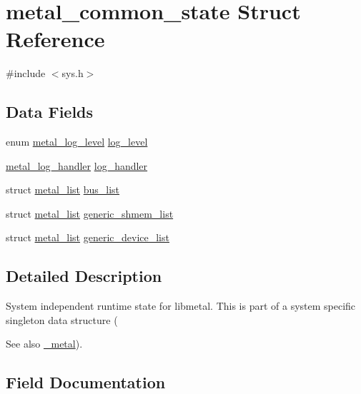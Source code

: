 \hypertarget{structmetal__common__state}{}\section{metal\+\_\+common\+\_\+state Struct Reference}
\label{structmetal__common__state}


{\ttfamily \#include $<$sys.\+h$>$}

\subsection*{Data Fields}
\begin{DoxyCompactItemize}
\item 
enum \hyperlink{group__logging_ga4ffa0f4a1339af510aca7f817ee36d82}{metal\+\_\+log\+\_\+level} \hyperlink{structmetal__common__state_a326c2fb27f8d538f7501d02bd6c3a851}{log\+\_\+level}
\item 
\hyperlink{group__logging_gaa79b2a8962227bb67c242b98afda292a}{metal\+\_\+log\+\_\+handler} \hyperlink{structmetal__common__state_abc8928c9100135369eeba2900ba860ea}{log\+\_\+handler}
\item 
struct \hyperlink{structmetal__list}{metal\+\_\+list} \hyperlink{structmetal__common__state_a47da0bf7bafa6e91aac71595110d95c7}{bus\+\_\+list}
\item 
struct \hyperlink{structmetal__list}{metal\+\_\+list} \hyperlink{structmetal__common__state_a4e6dbc8ec1a13f26a28c82b079f10395}{generic\+\_\+shmem\+\_\+list}
\item 
struct \hyperlink{structmetal__list}{metal\+\_\+list} \hyperlink{structmetal__common__state_a6fe99825ec2fb2d2388f598a1339a2c7}{generic\+\_\+device\+\_\+list}
\end{DoxyCompactItemize}


\subsection{Detailed Description}
System independent runtime state for libmetal. This is part of a system specific singleton data structure (\begin{DoxySeeAlso}{See also}
\hyperlink{group__system_ga929f8594b076a54b9773b4ab8ca2327d}{\+\_\+metal}). 
\end{DoxySeeAlso}


\subsection{Field Documentation}
\mbox{\label{structmetal__common__state_a47da0bf7bafa6e91aac71595110d95c7}} 
